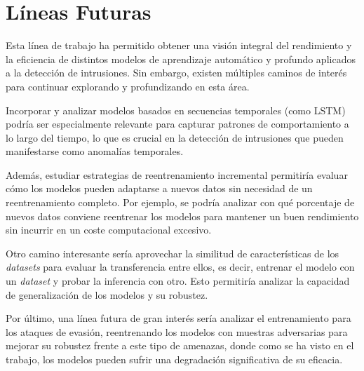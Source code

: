 \section{Líneas Futuras}

Esta línea de trabajo ha permitido obtener una visión integral del rendimiento y la eficiencia de distintos modelos de aprendizaje automático y profundo aplicados a la detección de intrusiones. Sin embargo, existen múltiples caminos de interés para continuar explorando y profundizando en esta área.

Incorporar y analizar modelos basados en secuencias temporales (como LSTM) podría ser especialmente relevante para capturar patrones de comportamiento a lo largo del tiempo, lo que es crucial en la detección de intrusiones que pueden manifestarse como anomalías temporales. 

Además, estudiar estrategias de reentrenamiento incremental permitiría evaluar cómo los modelos pueden adaptarse a nuevos datos sin necesidad de un reentrenamiento completo. Por ejemplo, se podría analizar con qué porcentaje de nuevos datos conviene reentrenar los modelos para mantener un buen rendimiento sin incurrir en un coste computacional excesivo.

Otro camino interesante sería aprovechar la similitud de características de los \textit{datasets} para evaluar la transferencia entre ellos, es decir, entrenar el modelo con un \textit{dataset} y probar la inferencia con otro. Esto permitiría analizar la capacidad de generalización de los modelos y su robustez.

Por último, una línea futura de gran interés sería analizar el entrenamiento para los ataques de evasión, reentrenando los modelos con muestras adversarias para mejorar su robustez frente a este tipo de amenazas, donde como se ha visto en el trabajo, los modelos pueden sufrir una degradación significativa de su eficacia.